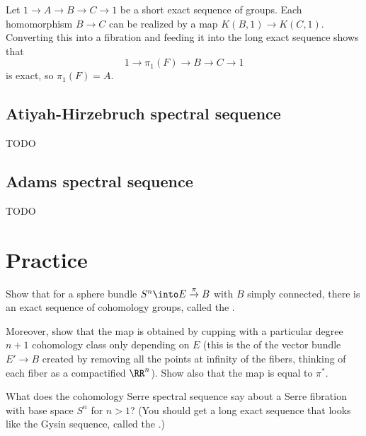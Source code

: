 \documentclass[10pt]{article}
\begin{document}
\begin{example}
    \label{ex:KG1-exact-seq}
    Let $1\to A\to B\to C\to 1$ be a short exact sequence of groups.
    Each homomorphism $B\to C$ can be realized by
    a map $K(B,1)\to K(C,1)$. Converting this into a fibration
    and feeding it into the long exact sequence shows that
    \begin{equation*}
        1\to \pi_1(F)\to B\to C\to 1
    \end{equation*}
    is exact, so $\pi_1(F) = A$.
\end{example}

\subsection{Atiyah-Hirzebruch spectral sequence}
TODO

\subsection{Adams spectral sequence}
TODO



\section{Practice}

\begin{exercise}
    \label{exer:gysin-seq}
    Show that for a sphere bundle
    $S^n\into E\overset\pi\to B$ with $B$ simply connected,
    there is an exact sequence of cohomology groups,
    called the .

    Moreover, show that the map  is obtained by
    cupping with a particular degree $n+1$
    cohomology class only depending on $E$
    (this is the  of the vector bundle $E'\to B$
    created by removing all the points at infinity of the fibers,
    thinking of each fiber as a compactified $\RR^n$).
    Show also that the map  is equal to $\pi^*$.
\end{exercise}

\begin{exercise}
    \label{exer:wang-seq}
    What does the cohomology Serre spectral sequence say
    about a Serre fibration with base space $S^n$ for $n > 1$?
    (You should get a long exact sequence
    that looks like the Gysin sequence, called the .)
\end{exercise}
\end{document}
